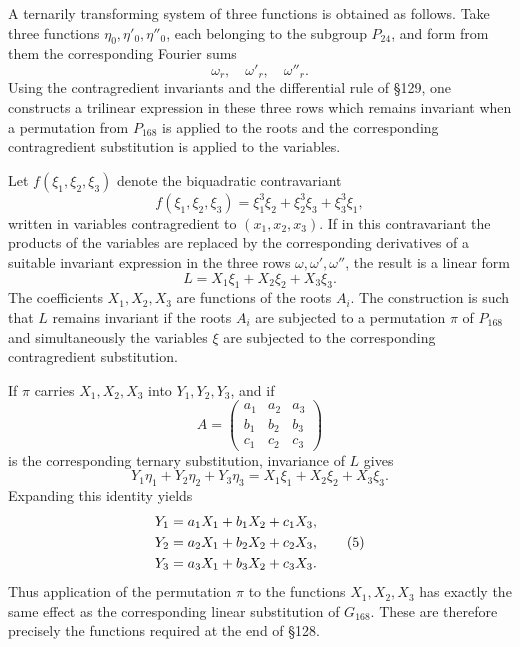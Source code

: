 \documentclass[11pt,a4paper]{book}
\begin{document}
A ternarily transforming system of three functions is obtained as follows.  Take three functions \(\eta_0,\eta'_0,\eta''_0\), each belonging to the subgroup \(P_{24}\), and form from them the corresponding Fourier sums
\[
 \omega_r,
\quad \omega'_r,
\quad \omega''_r.
\]
Using the contragredient invariants and the differential rule of \S 129, one constructs a trilinear expression in these three rows which remains invariant when a permutation from \(P_{168}\) is applied to the roots and the corresponding contragredient substitution is applied to the variables.

Let \(f(\xi_1,\xi_2,\xi_3)\) denote the biquadratic contravariant
\begin{equation}
 f(\xi_1,\xi_2,\xi_3)=\xi_1^3\xi_2+\xi_2^3\xi_3+\xi_3^3\xi_1, \tag{2}
\end{equation}
written in variables contragredient to \((x_1,x_2,x_3)\).  If in this contravariant the products of the variables are replaced by the corresponding derivatives of a suitable invariant expression in the three rows \(\omega,\omega',\omega''\), the result is a linear form
\begin{equation}
 L=X_1\xi_1+X_2\xi_2+X_3\xi_3. \tag{3}
\end{equation}
The coefficients \(X_1,X_2,X_3\) are functions of the roots \(A_i\).  The construction is such that \(L\) remains invariant if the roots \(A_i\) are subjected to a permutation \(\pi\) of \(P_{168}\) and simultaneously the variables \(\xi\) are subjected to the corresponding contragredient substitution.

If \(\pi\) carries \(X_1,X_2,X_3\) into \(Y_1,Y_2,Y_3\), and if
\[
 A=\begin{pmatrix}
 a_1&a_2&a_3\\ b_1&b_2&b_3\\ c_1&c_2&c_3
 \end{pmatrix}
\]
is the corresponding ternary substitution, invariance of \(L\) gives
\begin{equation}
 Y_1\eta_1+Y_2\eta_2+Y_3\eta_3=X_1\xi_1+X_2\xi_2+X_3\xi_3. \tag{4}
\end{equation}
Expanding this identity yields
\begin{align}
 Y_1&=a_1X_1+b_1X_2+c_1X_3,\notag\\
 Y_2&=a_2X_1+b_2X_2+c_2X_3,\tag{5}\\
 Y_3&=a_3X_1+b_3X_2+c_3X_3.\notag
\end{align}
Thus application of the permutation \(\pi\) to the functions \(X_1,X_2,X_3\) has exactly the same effect as the corresponding linear substitution of \(G_{168}\).  These are therefore precisely the functions required at the end of \S 128.
\end{document}
